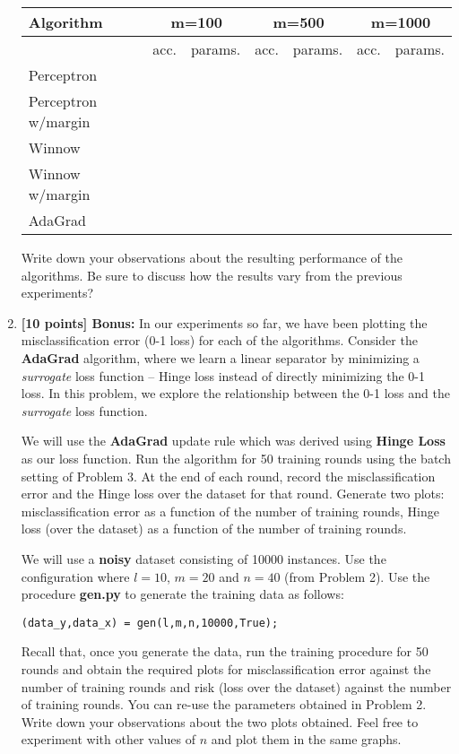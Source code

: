 \begin{enumerate}
\begin{center}
  \begin{tabular}{|l|l|l|l|l|l|l|}
\hline
 Algorithm      &  \multicolumn{2}{c|}{m=100} & \multicolumn{2}{c|}{m=500} & \multicolumn{2}{c|}{m=1000}\\\hline\hline
 & acc. & params. & acc. & params. & acc. & params.\\\hline
 Perceptron     & & & & & &\\\hline
 Perceptron w/margin & & & & & &\\\hline
 Winnow              & & & & & &\\\hline
 Winnow w/margin     & & & & & &\\\hline
 AdaGrad & & & & & &\\\hline
\end{tabular}
\end{center}
  Write down your observations about the resulting performance of the algorithms.
  Be sure to discuss how the results vary from the previous experiments?

\item {\bf [10 points] Bonus:} In our experiments so far, we have been plotting the  misclassification error (0-1 loss) for each of the algorithms. Consider the \textbf{AdaGrad} algorithm, where we learn a linear separator by minimizing a {\em surrogate} loss function -- Hinge loss instead of directly minimizing the 0-1 loss. 
In this problem, we explore the relationship between the 0-1 loss and the {\em surrogate} loss function. 

We will use the \textbf{AdaGrad} update rule which was derived using \textbf{Hinge Loss} as our loss function. Run the algorithm for 50 training rounds using the batch setting of Problem 3. At the end of each round, record the misclassification error and the Hinge loss over the dataset for that round. Generate two plots: misclassification error as a function of the number of training rounds, Hinge loss (over the dataset) as a function of the number of training rounds. 

We will use a \textbf{noisy} dataset consisting of 10000 instances. Use the configuration where $l = 10$, $m = 20$ and $n = 40$ (from Problem 2). Use the procedure \textbf{gen.py} to generate the training data as follows:

\begin{verbatim}
(data_y,data_x) = gen(l,m,n,10000,True);
\end{verbatim}

Recall that, once you generate the data, run the training procedure for 50 rounds and 
obtain the required plots for misclassification error against the number of training rounds and risk (loss over the dataset) against the number of training rounds. You can re-use the parameters obtained in Problem 2. Write down your observations about the two plots obtained. Feel free to experiment with other values of $n$ and plot them in the same graphs.
\end{enumerate}

